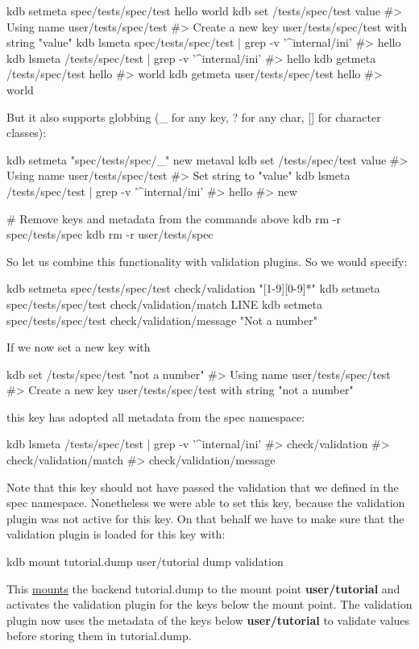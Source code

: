 \begin{DoxyCode}
kdb setmeta spec/tests/spec/test hello world
kdb set /tests/spec/test value
#> Using name user/tests/spec/test
#> Create a new key user/tests/spec/test with string "value"
kdb lsmeta spec/tests/spec/test | grep -v '^internal/ini'
#> hello
kdb lsmeta /tests/spec/test | grep -v '^internal/ini'
#> hello
kdb getmeta /tests/spec/test hello
#> world
kdb getmeta user/tests/spec/test hello
#> world
\end{DoxyCode}


But it also supports globbing ({\ttfamily \+\_\+} for any key, {\ttfamily ?} for any char, {\ttfamily \mbox{[}\mbox{]}} for character classes)\+:


\begin{DoxyCode}
kdb setmeta "spec/tests/spec/\_" new metaval
kdb set /tests/spec/test value
#> Using name user/tests/spec/test
#> Set string to "value"
kdb lsmeta /tests/spec/test | grep -v '^internal/ini'
#> hello
#> new

# Remove keys and metadata from the commands above
kdb rm -r spec/tests/spec
kdb rm -r user/tests/spec
\end{DoxyCode}


So let us combine this functionality with validation plugins. So we would specify\+:


\begin{DoxyCode}
kdb setmeta spec/tests/spec/test check/validation "[1-9][0-9]*"
kdb setmeta spec/tests/spec/test check/validation/match LINE
kdb setmeta spec/tests/spec/test check/validation/message "Not a number"
\end{DoxyCode}


If we now set a new key with 
\begin{DoxyCode}
kdb set /tests/spec/test "not a number"
#> Using name user/tests/spec/test
#> Create a new key user/tests/spec/test with string "not a number"
\end{DoxyCode}
 this key has adopted all metadata from the spec namespace\+: 
\begin{DoxyCode}
kdb lsmeta /tests/spec/test | grep -v '^internal/ini'
#> check/validation
#> check/validation/match
#> check/validation/message
\end{DoxyCode}
 Note that this key should not have passed the validation that we defined in the spec namespace. Nonetheless we were able to set this key, because the validation plugin was not active for this key. On that behalf we have to make sure that the validation plugin is loaded for this key with\+: 
\begin{DoxyCode}
kdb mount tutorial.dump user/tutorial dump validation
\end{DoxyCode}
 This \hyperlink{doc_tutorials_mount_md}{mounts} the backend {\ttfamily tutorial.\+dump} to the mount point {\bfseries user/tutorial} and activates the validation plugin for the keys below the mount point. The validation plugin now uses the metadata of the keys below {\bfseries user/tutorial} to validate values before storing them in {\ttfamily tutorial.\+dump}.

